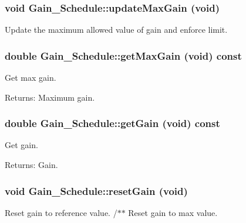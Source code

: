 \subsubsection{\setlength{\rightskip}{0pt plus 5cm}void Gain\_\-Schedule::update\-Max\-Gain (void)}\label{classGain__Schedule_6cf994aea246dbfa7c0161a2ea85e8b7}


Update the maximum allowed value of gain and enforce limit. 
\subsubsection{\setlength{\rightskip}{0pt plus 5cm}double Gain\_\-Schedule::get\-Max\-Gain (void) const\hspace{0.3cm}{\tt  [inline]}}\label{classGain__Schedule_a48a7da15dfca933eaf64ff05effb27c}


Get max gain. \begin{Desc}
\item[Returns:]Maximum gain. \end{Desc}
\subsubsection{\setlength{\rightskip}{0pt plus 5cm}double Gain\_\-Schedule::get\-Gain (void) const\hspace{0.3cm}{\tt  [inline]}}\label{classGain__Schedule_c39682e959e22b2ce1a701aa11ab40ad}


Get gain. \begin{Desc}
\item[Returns:]Gain. \end{Desc}
\subsubsection{\setlength{\rightskip}{0pt plus 5cm}void Gain\_\-Schedule::reset\-Gain (void)\hspace{0.3cm}{\tt  [inline]}}\label{classGain__Schedule_75dcb2056c045ddaf16f3e72db0696ca}


Reset gain to reference value. /$\ast$$\ast$ Reset gain to max value. 

